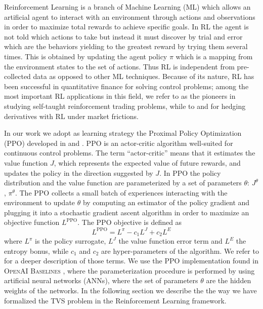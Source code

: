 \documentclass[11pt]{article}
\newcommand{\virgolette}[1]{``#1''}
\begin{document}
Reinforcement Learning is a branch of Machine Learning (ML) which allows an artificial agent to interact with an environment through actions and observations in order to maximize total rewards to achieve specific goals. In RL the agent is not told which actions to take but instead it must discover by trial and error which are the behaviors yielding to the greatest reward by trying them several times. This is obtained by updating the agent policy $\pi$ which is a mapping from the environment states to the set of actions. Thus RL is independent from pre-collected data as opposed to other ML techniques. Because of its nature, RL has been successful in quantitative finance for solving control problems; among the most important RL applications in this field, we refer to \textcite{pioneerrlfinance} as the pioneers in studying self-taught reinforcement trading problems, while to \textcite{rlintroductionfinance} and \textcite{rlfinance} for hedging derivatives with RL under market frictions.

In our work we adopt as learning strategy the Proximal Policy Optimization (PPO) developed in \textcite{ppo} and \textcite{gae}. PPO is an actor-critic algorithm well-suited for continuous control problems. The term \virgolette{actor-critic} means that it estimates the value function  $J$, which represents the expected value of future rewards, and updates the policy in the direction suggested by $J$. In PPO the policy distribution and the value function are parameterized by a set of parameters $\theta$: $J^\theta$, $\pi^\theta$. The PPO collects a small batch of experiences interacting with the environment to update $\theta$ by computing an estimator of the policy gradient and plugging it into a stochastic gradient ascent algorithm in order to maximize an objective function $L^{\text{PPO}}$. The PPO objective is defined as
\begin{equation}
	L^{\text{PPO}} = L^\pi - c_1 L^J + c_2 L^{E}
\end{equation}
where $L^\pi$ is the policy surrogate, $L^J$ the value function error term and $L^E$ the entropy bonus, while $c_1$ and $c_2$ are hyper-parameters of the algorithm. We refer to \textcite{ppo} for a deeper description of those terms. 
 We use the PPO implementation found in \textsc{OpenAI Baselines} \citep{baselines}, where the parameterization procedure is performed by using artificial neural networks (ANNs), where the set of parameters $\theta$ are the hidden weights of the networks. In the following section we describe the the way we have formalized the TVS problem in the Reinforcement Learning framework.
 
\end{document}
